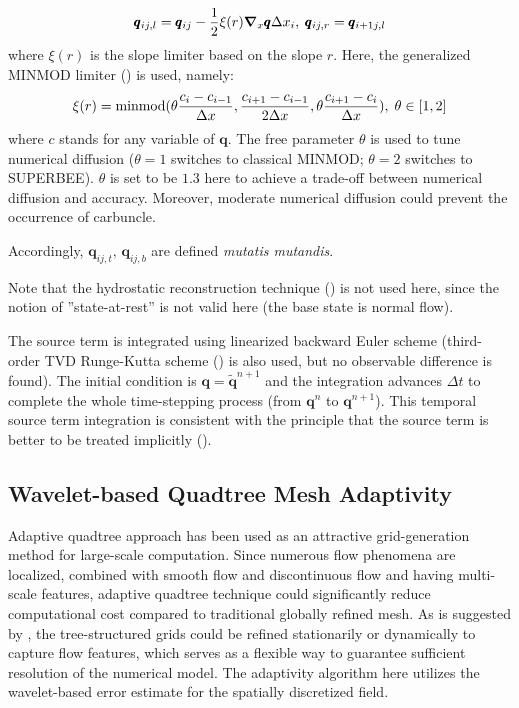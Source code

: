 \documentclass{jfm}
\begin{document}
\begin{equation}
\pmb{q}_{ij,l}=\pmb{q}_{ij}-\frac{1}{2}\xi(r){\grad}_x \pmb{q}\Delta x_i,\;
\pmb{q}_{ij,r}=\pmb{q}_{i+1j,l}
\end{equation}
where $\xi(r)$ is the slope limiter based on the slope $r$.
Here, the generalized MINMOD limiter (\cite{Kurganov2002b}) is used, namely:
\begin{equation}
\xi(r) = {\rm{minmod}}(\theta\frac{c_i-c_{i-1}}{\Delta x},  \frac{c_{i+1}-c_{i-1}}{2\Delta x},  \theta\frac{c_{i+1}-c_i}{\Delta x}),\;\theta \in [1,2]
\label{gminmod}
\end{equation}
where $c$ stands for any variable of $\pmb{q}$. The free parameter $\theta$ is used to tune numerical diffusion ($\theta=1$ switches to classical MINMOD; $\theta=2$ switches to SUPERBEE). $\theta$ is set to be $1.3$ here to achieve a trade-off between numerical diffusion and accuracy. Moreover, moderate numerical diffusion could prevent the occurrence of carbuncle.


Accordingly, $\pmb{q}_{ij,t},\,\pmb{q}_{ij,b}$ are defined \textit{mutatis mutandis}.

Note that the hydrostatic reconstruction technique (\cite{Audusse2004}) is not used here, since the notion of  ''state-at-rest'' is not valid here (the base state is normal flow).

The source term is integrated using  linearized backward Euler scheme (third-order TVD Runge-Kutta scheme (\cite{Shu1988}) is also used, but no observable difference is found).  The initial condition is $\pmb{q}=\tilde{\pmb{q}}^{n+1}$ and the integration advances $\Delta t$ to complete the whole time-stepping process (from $\pmb{q}^{n}$ to $\pmb{q}^{n+1}$). This temporal source term integration is consistent with the principle that the source term is better to be treated implicitly (\cite{Pareschi2005}).

\subsection{Wavelet-based Quadtree Mesh Adaptivity}\label{amr_intro}
Adaptive quadtree approach has been used as an attractive grid-generation method for large-scale computation. Since numerous flow phenomena are localized, combined with smooth flow and discontinuous flow and having multi-scale features, adaptive quadtree technique could significantly reduce computational cost compared to traditional globally refined mesh. As is suggested by  \cite{Popinet2003}, the  tree-structured grids could be refined stationarily or dynamically to capture flow features, which serves as a flexible way to guarantee sufficient resolution of the numerical model. The adaptivity algorithm here utilizes the wavelet-based error estimate for the spatially discretized field. 
\end{document}
